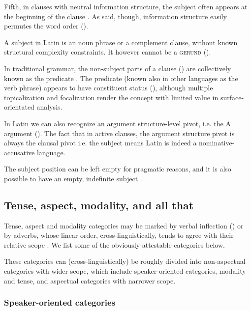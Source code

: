 \documentclass[a4paper, oneside, 12pt]{report}
\newcommand*{\citesec}[1]{\S~{#1}}
\newcommand*{\citepage}[1]{p.~{#1}}
\newcommand*{\category}[1]{\textsc{#1}}
\begin{document}
Fifth, in clauses with neutral information structure,
the subject often appears at the beginning of the clause \citep[\citepage{79}]{devine2006latin}.
As said, though, information structure easily permutes the word order ().

A subject in Latin is an noun phrase or a complement clause,
without known structural complexity constraints.
It however cannot be a \category{gerund} ().

In traditional grammar, the non-subject parts of a clause () are collectively known as the predicate \citep[\citepage{164}]{allen1903allen}.
The predicate (known also in other languages as the verb phrase) appears to have constituent status (),
although multiple topicalization and focalization render the concept with limited value in surface-orientated analysis.

In Latin we can also recognize an argument structure-level pivot, i.e. the A argument
().
The fact that in active clauses, the argument structure pivot is always the clausal pivot i.e. the subject 
means Latin is indeed a nominative-accusative language.

The subject position can be left empty for pragmatic reasons,
and it is also possible to have an empty, indefinite subject \citep[\citesec{9.9}]{Pinkster1}.

\subsection{Tense, aspect, modality, and all that}\label{sec:grammatical.clause.tam}

Tense, aspect and modality categories may be marked by verbal inflection 
() or by adverbs, whose linear order, cross-linguistically, tends to agree with their relative scope \citep{cinque1999adverbs}.
We list some of the obviously attestable categories below.

These categories can (cross-linguistically) be roughly divided into non-aspectual categories with wider scope, which include speaker-oriented categories, modality and tense, and aspectual categories with narrower scope.

\subsubsection{Speaker-oriented categories}
\end{document}
